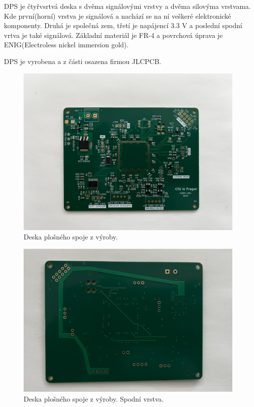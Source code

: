 DPS je čtyřvsrtvá deska s dvěma signálovými vrstvy a dvěma silovýma vrstvama. Kde první(horní) vrstva je signálová a nachází se na ní veškeré elektronické komponenty. Druhá je společná zem, třetí je napájencí 3.3 V a poslední spodní vrtva je také signálová.
Základní materiál je FR-4 a povrchová úprava je ENIG(Electroless nickel immersion gold).
\par
DPS je vyrobena a z části osazena firmou JLCPCB.
\begin{figure}[H]
    \includegraphics[width=1\linewidth]{pictures/pcb_from_production.jpg}
    \caption{Deska plošného spoje z výroby.}
    \label{fig:pcb_production}
\end{figure}
\begin{figure}[H]
    \includegraphics[width=1\linewidth]{pictures/pcb_production_bottom.jpg}
    \caption{Deska plošného spoje z výroby. Spodní vrstva.}
    \label{fig:pcb_production_bottom}
\end{figure}

